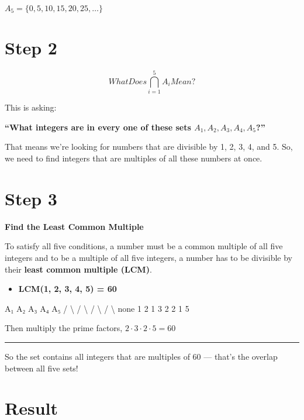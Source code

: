 \documentclass[
  letterpaper,
  DIV=11,
  numbers=noendperiod]{scrreprt}
\newenvironment{Shaded}{\begin{snugshade}}{\end{snugshade}}
\newcommand{\NormalTok}[1]{\textcolor[rgb]{0.00,0.23,0.31}{#1}}
\providecommand{\tightlist}{%
  \setlength{\itemsep}{0pt}\setlength{\parskip}{0pt}}
\begin{document}
\(A_5 = \{0,5,10,15,20,25, \ldots\}\)

\section{Step 2}

\[
What Does \bigcap_{i=1}^5 A_i Mean?
\]

This is asking:

{\textbf{``What integers are in every one of these sets
\(A_1, A_2, A_3, A_4, A_5\)?''}}

That means we're looking for numbers that are divisible by 1, 2, 3, 4,
and 5. So, we need to find integers that are multiples of all these
numbers at once.

\section{Step 3}

\textbf{Find the Least Common Multiple}

To satisfy all five conditions, a number must be a common multiple of
all five integers and to be a multiple of all five integers, a number
has to be divisible by their \textbf{least common multiple (LCM)}.

\begin{itemize}
\tightlist
\item
  \textbf{LCM(1, 2, 3, 4, 5) = 60}
\end{itemize}

\begin{Shaded}
\begin{Highlighting}[]
\NormalTok{  A₁      A₂        A₃        A₄        A₅}
\NormalTok{         / \textbackslash{}       / \textbackslash{}       / \textbackslash{}       / \textbackslash{}}
\NormalTok{ none   1   2     1   3     2   2     1   5}
\end{Highlighting}
\end{Shaded}

Then multiply the prime factors, \(2 \cdot 3 \cdot 2 \cdot 5=60\)

\begin{center}\rule{0.5\linewidth}{0.5pt}\end{center}

So the set contains all integers that are multiples of 60 --- that's the
overlap between all five sets!

\section{Result}
\end{document}
